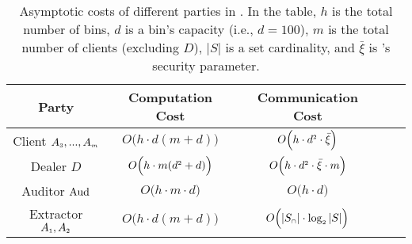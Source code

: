 

 \begin{table}[!htb]

\caption{ {\small{Asymptotic costs of different parties in \epsi. In the table, $h$ is the total number of bins, $d$ is a bin's capacity (i.e., $d=100$), $m$ is the total number of clients (excluding $D$), $|S|$ is a set cardinality, and $\bar\xi$ is \ole's security parameter.
%
}}} \label{table::Asymptotic-Cost} 
\begin{center}
\renewcommand{\arraystretch}{1.2}
\begin{tabular}{|c|c|c|c|c|} 

        \cline{1-3}  
{\scriptsize {Party}}&{\scriptsize {Computation Cost}}&{\scriptsize {Communication Cost}}\\
     \cline{1-3}  
\hline

\scriptsize Client $A_{\scriptscriptstyle  3},...,    A_{\scriptscriptstyle   m}$& \cellcolor{gray!50}   \scriptsize$O\Big(h\cdot d(m+d)\Big)$& \cellcolor{gray!50}  \scriptsize$O\Big(h\cdot d^{\scriptscriptstyle 2}\cdot \bar\xi\Big)$\\
     \cline{1-3}  
\scriptsize Dealer $D$&   \cellcolor{gray!20}\scriptsize$O\Big(h\cdot m(d^{\scriptscriptstyle 2}+d)\Big)$ &  \cellcolor{gray!20}\scriptsize$O\Big(h\cdot d^{\scriptscriptstyle 2}\cdot \bar\xi\cdot m\Big)$\\
      \cline{1-3}   
      

       
   \scriptsize   {Auditor $\aud$ }& \cellcolor{gray!50}\scriptsize$O\Big(h\cdot m\cdot d\Big)$&  \cellcolor{gray!50}\scriptsize$O\Big(h\cdot d\Big)$\\      
            \cline{1-3} 

 \scriptsize{Extractor} $A_{\scriptscriptstyle  1},    A_{\scriptscriptstyle   2}$& \cellcolor{gray!20}\scriptsize$O\Big(h\cdot d(m+d)\Big)$& \cellcolor{gray!20}\scriptsize$O\Big(|S_{\scriptscriptstyle\cap}|\cdot \log_{\scriptscriptstyle 2}|S|\Big)$\\
     \cline{2-3}
     \cline{1-3}  
     

\end{tabular}
\end{center}
\end{table}
